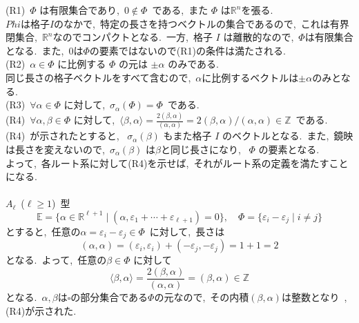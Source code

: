 \documentclass[uplatex,dvipdfmx]{jsarticle}
\begin{document}
\begin{myproof}
    (R1)~$\Phi$ は有限集合であり,~$0 \notin \Phi$~である,~また $\Phi$ は$\mathbb{R}^n$を張る.\\
    $Phi$は格子$I$のなかで,~特定の長さを持つベクトルの集合であるので,~これは有界閉集合,~$\mathbb{R}^n$なのでコンパクトとなる.~一方,~格子 $I$ は離散的なので,~$\Phi$は有限集合となる.~また,~$0$は$\Phi$の要素ではないので(R1)の条件は満たされる.\\
    (R2)~$\alpha \in \Phi$ に比例する $\Phi$ の元は $\pm\alpha$ のみである.\\
    同じ長さの格子ベクトルをすべて含むので,~$\alpha$に比例するベクトルは$\pm \alpha$のみとなる.\\
    (R3)~$\forall \alpha \in \Phi$ に対して,~$\sigma_\alpha(\Phi) = \Phi$~である.\\
    (R4)~$\forall \alpha, \beta \in \Phi$ に対して,~$\langle \beta, \alpha \rangle = \frac{2(\beta, \alpha)}{(\alpha, \alpha)} =2(\beta, \alpha)/(\alpha, \alpha) \in \mathbb{Z}$~である.\\
    (R4)~が示されたとすると,~ $\sigma_\alpha(\beta)$ もまた格子 $I$ のベクトルとなる.~また,~鏡映は長さを変えないので,~$\sigma_\alpha(\beta)$ は$\beta$と同じ長さになり,~ $\Phi$ の要素となる.\\
    よって,~各ルート系に対して(R4)を示せば,~それがルート系の定義を満たすことになる.\\\\
    $A_\ell$~($\ell \geq 1$)~型\\
    \begin{equation*}
        \mathbb{E}=\{ \alpha \in \mathbb{R}^{\ell+1} \mid (\alpha, \varepsilon_1 + \cdots + \varepsilon_{\ell+1}) = 0 \}, \quad \Phi = \{\varepsilon_i - \varepsilon_j \mid i \neq j\}
    \end{equation*}
    とすると,~任意の$\alpha = \varepsilon_i - \varepsilon_j \in \Phi$~に対して,~長さは
    \begin{equation*}
        (\alpha, \alpha) = (\varepsilon_i, \varepsilon_i) + (-\varepsilon_j, -\varepsilon_j) = 1 + 1 = 2
    \end{equation*}
    となる.~よって,~任意の$\beta \in \Phi$ に対して
    \begin{equation*}
        \langle \beta, \alpha \rangle = \frac{2(\beta, \alpha)}{(\alpha, \alpha)} = (\beta, \alpha) \in \mathbb{Z}
    \end{equation*}
    となる.~$\alpha,\beta$は$\square$の部分集合である$\Phi$の元なので,~その内積$(\beta,\alpha)$は整数となり~,(R4)が示された.\\

\end{myproof}
\end{document}
